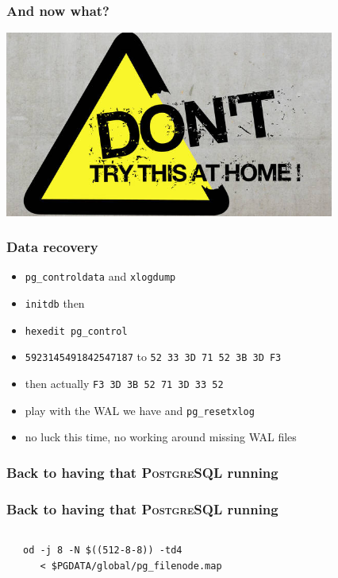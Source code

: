 \documentclass{beamer}
\begin{document}
\begin{frame}
  \frametitle{And now what?}

  \begin{center}
    \includegraphics[height=2.4in]{Dont-Try-This-At-Home.jpg}
  \end{center}
\end{frame}

\begin{frame}[fragile]
  \frametitle{Data recovery}


  \vfill  
  \begin{itemize}
  \item \texttt{pg\_controldata} and \texttt{xlogdump}
  \item \texttt{initdb} then
  \item \texttt{hexedit pg\_control}
  \item \texttt{5923145491842547187} to \texttt{52 33 3D 71 52 3B 3D F3}
  \item then actually \texttt{F3 3D 3B 52 71 3D 33 52}
  \item play with the WAL we have and \texttt{pg\_resetxlog}
  \item no luck this time, no working around missing WAL files
  \end{itemize}
\end{frame}

\begin{frame}
  \frametitle{Back to having that \textsc{PostgreSQL} running}

  \vfill
\end{frame}

\begin{frame}[fragile]
  \frametitle{Back to having that \textsc{PostgreSQL} running}
  
  \vfill

  \begin{columns}[c]
    \\
\begin{verbatim}
od -j 8 -N $((512-8-8)) -td4
   < $PGDATA/global/pg_filenode.map
\end{verbatim}
  \end{columns}
\end{frame}
\end{document}
